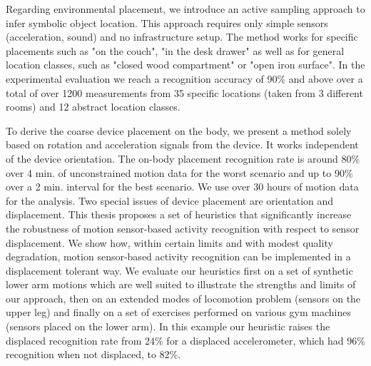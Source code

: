 Regarding environmental placement, we introduce an active sampling approach
to infer symbolic object location. This approach requires only simple sensors (acceleration,
sound) and no infrastructure setup. The method works for specific
placements such as "on the couch", "in the desk drawer" as well as for
general location classes, such as "closed wood compartment" or "open
iron surface". In the experimental evaluation we reach a
recognition accuracy of 90\% and above over a total of over 1200 measurements from 35
 specific locations (taken from 3 different rooms) and 12 abstract
 location classes. 
 
 To derive the coarse device placement on the body, we present 
a method solely based on rotation and acceleration signals
from the device. It works independent of the device orientation.
 The on-body placement recognition rate is around 80\%
 over 4 min. of unconstrained motion data for the worst scenario and
 up to 90\% over a 2 min. interval for the best scenario.
We use over 30 hours of motion data for the analysis.
Two special issues of device placement are orientation and displacement.
This thesis proposes a set of heuristics that significantly 
increase the robustness of motion sensor-based activity recognition 
with respect to sensor displacement. We show how, within 
certain limits and with modest quality degradation, motion sensor-based 
activity recognition can be implemented in a displacement tolerant way.
We evaluate our heuristics first on a set of synthetic lower arm
 motions which are well suited to illustrate the strengths and limits
 of our approach, then on an extended modes of locomotion problem
 (sensors on the upper leg) and finally on a set of exercises performed
 on various gym machines (sensors placed on the lower arm). 
In this example our heuristic raises the displaced recognition rate
 from 24\% for a displaced accelerometer, which had 96\% recognition
 when not displaced, to 82\%.

   
